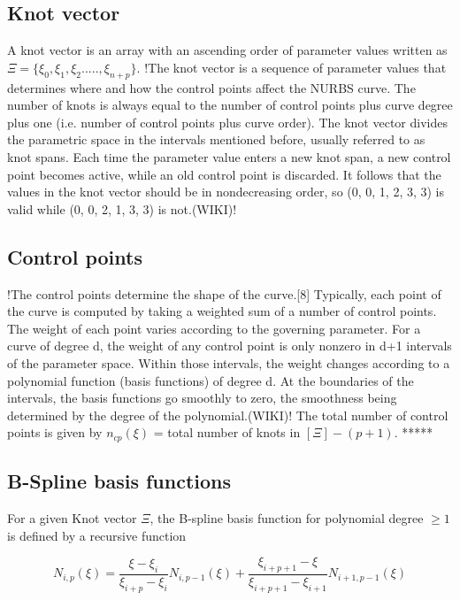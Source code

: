 \documentclass[12pt]{article}
\begin{document}
\subsection{Knot vector }
A knot vector is an array with an ascending order of parameter values written as $\Xi = \{ \xi_0,\xi_1,\xi_2.....,\xi_{n+p}\}$.
!The knot vector is a sequence of parameter values that determines where and how the control points affect the NURBS curve. The number of knots is always equal to the number of control points plus curve degree plus one (i.e. number of control points plus curve order). The knot vector divides the parametric space in the intervals mentioned before, usually referred to as knot spans. Each time the parameter value enters a new knot span, a new control point becomes active, while an old control point is discarded. It follows that the values in the knot vector should be in nondecreasing order, so (0, 0, 1, 2, 3, 3) is valid while (0, 0, 2, 1, 3, 3) is not.(WIKI)!

\subsection{Control points }
!The control points determine the shape of the curve.[8] Typically, each point of the curve is computed by taking a weighted sum of a number of control points. The weight of each point varies according to the governing parameter. For a curve of degree d, the weight of any control point is only nonzero in d+1 intervals of the parameter space. Within those intervals, the weight changes according to a polynomial function (basis functions) of degree d. At the boundaries of the intervals, the basis functions go smoothly to zero, the smoothness being determined by the degree of the polynomial.(WIKI)! The total number of control points is given by $n_{cp}(\xi)$ = total number of knots in $[\Xi] - (p+1)$. *****



\subsection{B-Spline basis functions }

For a given Knot vector $\Xi$, the B-spline basis function for polynomial degree $\geq 1$ is defined by a recursive function

\begin{equation}
N_{i,p}(\xi) = \frac{\xi-\xi_{i}}{\xi_{i+p}-\xi_{i}} N_{i,p-1}(\xi) + 
\frac{\xi_{i+p+1}-\xi}{\xi_{i+p+1}-\xi_{i+1}} N_{i+1,p-1}(\xi)
\end{equation}
\end{document}
